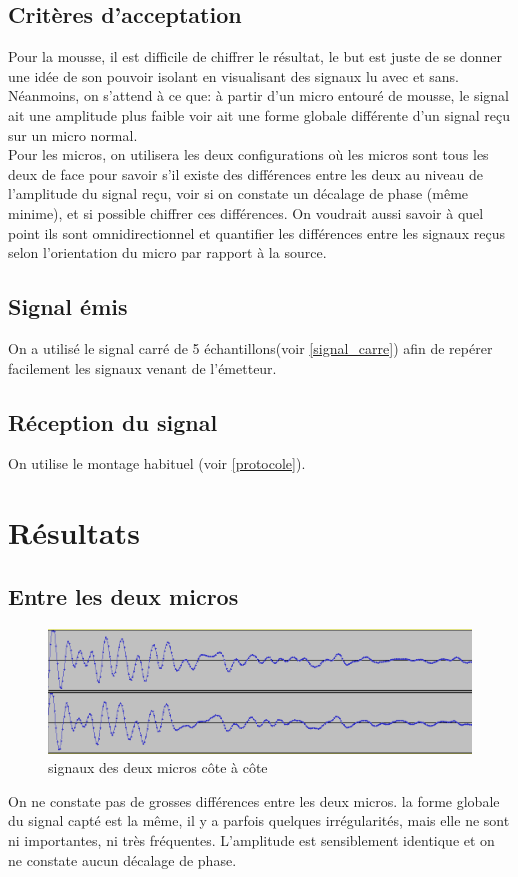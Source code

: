 \subsection{Critères d'acceptation}
Pour la mousse, il est difficile de chiffrer le résultat, le but est juste de se donner une idée de son pouvoir isolant en visualisant des signaux lu avec et sans. Néanmoins, on s'attend à ce que: à partir d'un micro entouré de mousse, le signal ait une amplitude plus faible voir ait une forme globale différente d'un signal reçu sur un micro normal.\\
Pour les micros, on utilisera les deux configurations où les micros sont tous les deux de face pour savoir s'il existe des différences entre les deux au niveau de l'amplitude du signal reçu, voir si on constate un décalage de phase (même minime), et si possible chiffrer ces différences. On voudrait aussi savoir à quel point ils sont omnidirectionnel et quantifier les différences entre les signaux reçus selon l'orientation du micro par rapport à la source.


\subsection{Signal émis}
On a utilisé le signal carré de 5 échantillons(voir \ref{signal_carre}) afin de repérer facilement les signaux venant de l'émetteur.

\subsection{Réception du signal}
On utilise le montage habituel (voir \ref{protocole}).

\section{Résultats}

\subsection{Entre les deux micros}\label{differences_entre_micros}

\begin{figure}[H]
\includegraphics[width=\textwidth]{resources/img/micros_face.png}
\caption{signaux des deux micros côte à côte}
\end{figure}
On ne constate pas de grosses différences entre les deux micros. la forme globale du signal capté est la même, il y a parfois quelques irrégularités, mais elle ne sont ni importantes, ni très fréquentes. L'amplitude est sensiblement identique et on ne constate aucun décalage de phase.

